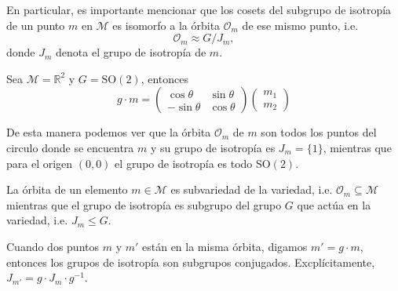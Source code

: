 En particular, es importante mencionar que los cosets del subgrupo de isotrop\'{i}a de un punto $m$ en $\mathcal{M}$ es isomorfo a la \'{o}rbita $\mathcal{O}_{m}$ de ese mismo punto, i.e.
%
\begin{equation*}
\mathcal{O}_{m} \approx G/J_{m},
\end{equation*}
%
donde $J_{m}$ denota el grupo de isotrop\'{i}a de $m$.

\begin{ex}
Sea $\mathcal{M}=\mathbb{R}^{2}$ y $G=\mathrm{SO}(2)$, entonces
%
\begin{equation*}
g \cdot m =
\begin{pmatrix} \cos \theta & \sin \theta \\ -\sin \theta & \cos \theta \end{pmatrix}
\begin{pmatrix} m_{1} \\ m_{2} \end{pmatrix}
\end{equation*}

\begin{center}
\end{center}

De esta manera podemos ver que la \'{o}rbita $\mathcal{O}_{m}$ de $m$ son todos los puntos del circulo donde se encuentra $m$ y su grupo de isotrop\'{i}a es $J_{m} = \{1\}$, mientras que para el origen $(0,0)$ el grupo de isotrop\'{i}a es todo $\mathrm{SO}(2)$.
\end{ex}

\begin{obs}
La \'{o}rbita de un elemento $m \in \mathcal{M}$ es subvariedad de la variedad, i.e. $\mathcal{O}_{m} \subseteq \mathcal{M}$ mientras que el grupo de isotrop\'{i}a es subgrupo del grupo $G$ que act\'{u}a en la variedad, i.e. $J_{m} \leq G$.
\end{obs}

\begin{obs}
\label{obs:IsotropyGroupConj}
Cuando dos puntos $m$ y $m'$ est\'{a}n en la misma \'{o}rbita, digamos $m' = g \cdot m$, entonces los grupos de isotrop\'{i}a son subgrupos conjugados. Excpl\'{i}citamente,  $J_{m'} = g \cdot J_{m} \cdot g^{-1}$.
\end{obs}

